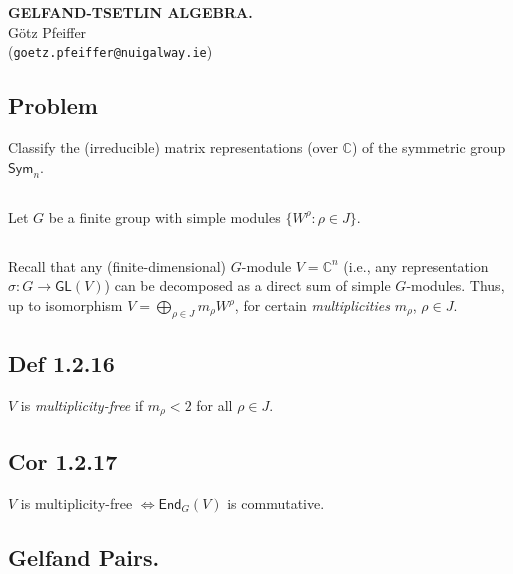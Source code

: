 \documentclass[a4paper]{amsart}
\newcommand{\C}{\mathbb{C}}
\newcommand{\Sym}{\mathsf{Sym}}
\newcommand{\GL}{\mathsf{GL}}
\newcommand{\End}{\mathsf{End}}
\begin{document}
\begin{center}
  \textbf{\uppercase{
Gelfand-Tsetlin Algebra.
}}\\
G\"otz Pfeiffer \\
(\texttt{goetz.pfeiffer@nuigalway.ie})
\end{center}

\subsection{Problem}
Classify the (irreducible) matrix representations (over $\C$) of the symmetric group $\Sym_n$.

\subsection{}
Let $G$ be a finite group with simple modules $\{W^{\rho}: \rho \in J\}$.

\subsection{}
Recall that any (finite-dimensional) $G$-module $V = \C^n$ (i.e., any representation
$\sigma \colon G \to \GL(V)$) can be decomposed as a direct
sum of simple $G$-modules.  Thus, up to isomorphism
$V = \bigoplus_{\rho \in J} m_{\rho} W^{\rho}$, for certain \emph{multiplicities}
$m_{\rho}$, $\rho \in J$.

\subsection{Def 1.2.16}
$V$ is \emph{multiplicity-free} if $m_{\rho} < 2$ for all $\rho \in J$.

\subsection{Cor 1.2.17}
$V$ is multiplicity-free $\iff \End_G(V)$ is commutative.


\subsection{}

\subsection{}

\subsection{}

\subsection{}

\subsection{}

\subsection{}






\subsection{Gelfand Pairs.}
\end{document}
